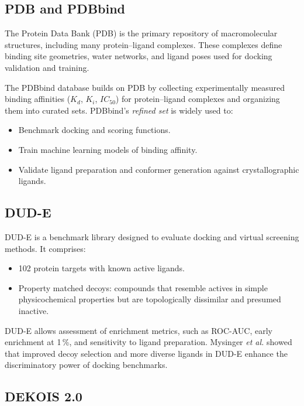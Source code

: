 \documentclass[12pt, a4paper]{article}
\begin{document}
\subsection{PDB and PDBbind}

The Protein Data Bank (PDB) is the primary repository of macromolecular structures, including many protein–ligand complexes.\cite{CH6_Berman2000} These complexes define binding site geometries, water networks, and ligand poses used for docking validation and training.

The PDBbind database builds on PDB by collecting experimentally measured binding affinities ($K_d$, $K_i$, $IC_{50}$) for protein–ligand complexes and organizing them into curated sets.\cite{CH6_WangPDBbind} PDBbind's \emph{refined set} is widely used to:

\begin{itemize}
  \item Benchmark docking and scoring functions.
  \item Train machine learning models of binding affinity.
  \item Validate ligand preparation and conformer generation against crystallographic ligands.
\end{itemize}

\subsection{DUD-E}

DUD-E is a benchmark library designed to evaluate docking and virtual screening methods.\cite{CH6_Mysinger2012} It comprises:
\begin{itemize}
  \item 102 protein targets with known active ligands.
  \item Property matched decoys: compounds that resemble actives in simple physicochemical properties but are topologically dissimilar and presumed inactive.
\end{itemize}

DUD-E allows assessment of enrichment metrics, such as ROC-AUC, early enrichment at 1\,\%, and sensitivity to ligand preparation. Mysinger \emph{et al.} showed that improved decoy selection and more diverse ligands in DUD-E enhance the discriminatory power of docking benchmarks.\cite{CH6_Mysinger2012}

\subsection{DEKOIS 2.0}
\end{document}
